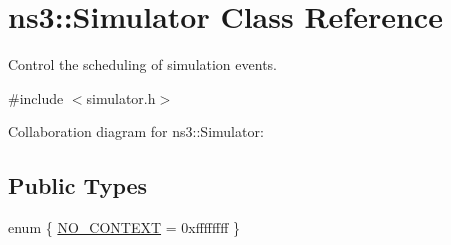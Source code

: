 \hypertarget{classns3_1_1Simulator}{}\section{ns3\+:\+:Simulator Class Reference}
\label{classns3_1_1Simulator}


Control the scheduling of simulation events.  




{\ttfamily \#include $<$simulator.\+h$>$}



Collaboration diagram for ns3\+:\+:Simulator\+:
\subsection*{Public Types}
\begin{DoxyCompactItemize}
\item 
enum \{ \hyperlink{classns3_1_1Simulator_ab25cc4cd782af44b5843ce7258ecde10abaefe68ccc9945956c166aaeea2e986e}{N\+O\+\_\+\+C\+O\+N\+T\+E\+XT} = 0xffffffff
 \}
\end{DoxyCompactItemize}
